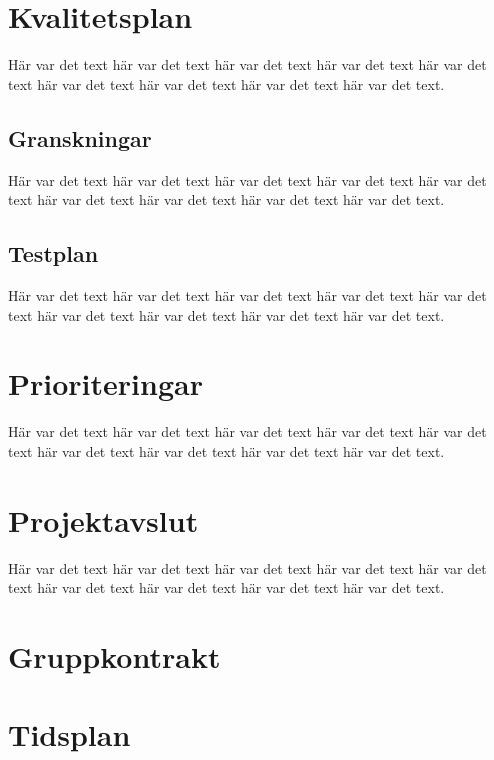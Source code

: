 \documentclass[a4paper,titlepage,12pt]{article}
\begin{document}
	
	\section{Kvalitetsplan}
	Här var det text här var det text här var det text
	här var det text här var det text här var det text
	här var det text här var det text här var det text.
	
	
	\subsection{Granskningar}
	Här var det text här var det text här var det text
	här var det text här var det text här var det text
	här var det text här var det text här var det text.
	
	
	\subsection{Testplan}
	Här var det text här var det text här var det text
	här var det text här var det text här var det text
	här var det text här var det text här var det text.
	
	
	
	
	\section{Prioriteringar}
	Här var det text här var det text här var det text
	här var det text här var det text här var det text
	här var det text här var det text här var det text.
	
	
	\section{Projektavslut}
	Här var det text här var det text här var det text
	här var det text här var det text här var det text
	här var det text här var det text här var det text.

\begin{appendices}
    \section{Gruppkontrakt\label{app:gruppkontrakt}}
    \section{Tidsplan\label{app:tidsplan}}
\end{appendices}
\end{document}
